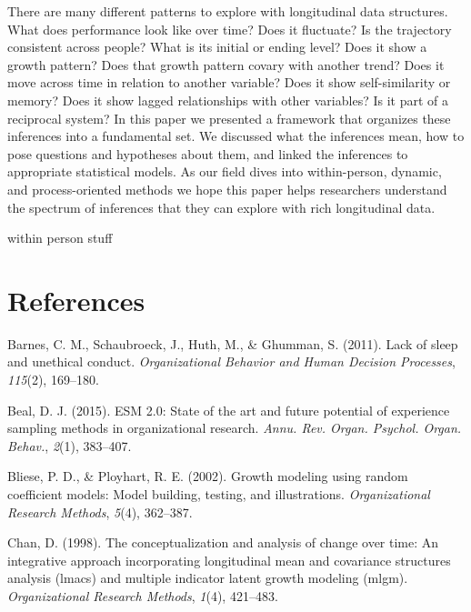 \documentclass[english,,man]{apa6}
\theoremstyle{definition}
\theoremstyle{definition}
\theoremstyle{definition}
\theoremstyle{remark}
\begin{document}
There are many different patterns to explore with longitudinal data
structures. What does performance look like over time? Does it
fluctuate? Is the trajectory consistent across people? What is its
initial or ending level? Does it show a growth pattern? Does that growth
pattern covary with another trend? Does it move across time in relation
to another variable? Does it show self-similarity or memory? Does it
show lagged relationships with other variables? Is it part of a
reciprocal system? In this paper we presented a framework that organizes
these inferences into a fundamental set. We discussed what the
inferences mean, how to pose questions and hypotheses about them, and
linked the inferences to appropriate statistical models. As our field
dives into within-person, dynamic, and process-oriented methods we hope
this paper helps researchers understand the spectrum of inferences that
they can explore with rich longitudinal data.

within person stuff

\newpage

\hypertarget{references}{%
\section{References}\label{references}}

\setlength{\parindent}{-0.5in}
\setlength{\leftskip}{0.5in}

\hypertarget{refs}{}
\leavevmode\hypertarget{ref-barnes_lack_2011}{}%
Barnes, C. M., Schaubroeck, J., Huth, M., \& Ghumman, S. (2011). Lack of
sleep and unethical conduct. \emph{Organizational Behavior and Human
Decision Processes}, \emph{115}(2), 169--180.

\leavevmode\hypertarget{ref-beal_esm_2015}{}%
Beal, D. J. (2015). ESM 2.0: State of the art and future potential of
experience sampling methods in organizational research. \emph{Annu. Rev.
Organ. Psychol. Organ. Behav.}, \emph{2}(1), 383--407.

\leavevmode\hypertarget{ref-bliese_growth_2002}{}%
Bliese, P. D., \& Ployhart, R. E. (2002). Growth modeling using random
coefficient models: Model building, testing, and illustrations.
\emph{Organizational Research Methods}, \emph{5}(4), 362--387.

\leavevmode\hypertarget{ref-chan1998conceptualization}{}%
Chan, D. (1998). The conceptualization and analysis of change over time:
An integrative approach incorporating longitudinal mean and covariance
structures analysis (lmacs) and multiple indicator latent growth
modeling (mlgm). \emph{Organizational Research Methods}, \emph{1}(4),
421--483.
\end{document}
